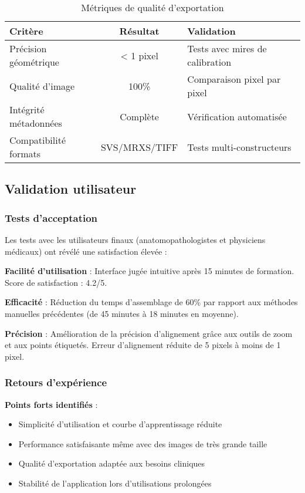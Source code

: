 \documentclass[12pt,a4paper]{report}
\begin{document}
\begin{table}[H]
\centering
\begin{tabular}{|l|c|l|}
\hline
\textbf{Critère} & \textbf{Résultat} & \textbf{Validation} \\
\hline
Précision géométrique & < 1 pixel & Tests avec mires de calibration \\
\hline
Qualité d'image & 100\% & Comparaison pixel par pixel \\
\hline
Intégrité métadonnées & Complète & Vérification automatisée \\
\hline
Compatibilité formats & SVS/MRXS/TIFF & Tests multi-constructeurs \\
\hline
\end{tabular}
\caption{Métriques de qualité d'exportation}
\label{tab:qualite_export}
\end{table}

\subsection{Validation utilisateur}

\subsubsection{Tests d'acceptation}

Les tests avec les utilisateurs finaux (anatomopathologistes et physiciens médicaux) ont révélé une satisfaction élevée :

\textbf{Facilité d'utilisation} : Interface jugée intuitive après 15 minutes de formation. Score de satisfaction : 4.2/5.

\textbf{Efficacité} : Réduction du temps d'assemblage de 60\% par rapport aux méthodes manuelles précédentes (de 45 minutes à 18 minutes en moyenne).

\textbf{Précision} : Amélioration de la précision d'alignement grâce aux outils de zoom et aux points étiquetés. Erreur d'alignement réduite de 5 pixels à moins de 1 pixel.

\subsubsection{Retours d'expérience}

\textbf{Points forts identifiés} :
\begin{itemize}
\item Simplicité d'utilisation et courbe d'apprentissage réduite
\item Performance satisfaisante même avec des images de très grande taille
\item Qualité d'exportation adaptée aux besoins cliniques
\item Stabilité de l'application lors d'utilisations prolongées
\end{itemize}
\end{document}
